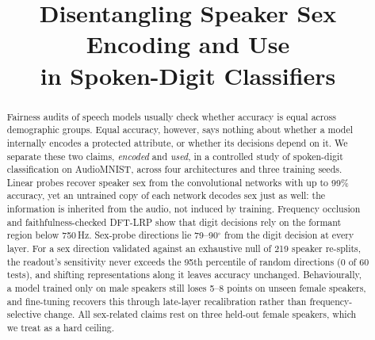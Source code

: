 \documentclass[conference]{IEEEtran}
\begin{document}
\title{Disentangling Speaker Sex Encoding and Use\\ in Spoken-Digit Classifiers}

\author{
\and
{}
}

\maketitle

\begin{abstract}
Fairness audits of speech models usually check whether accuracy is equal
across demographic groups. Equal accuracy, however, says nothing about
whether a model internally encodes a protected attribute, or whether its
decisions depend on it. We separate these two claims, \emph{encoded} and
\emph{used}, in a controlled study of spoken-digit classification on
AudioMNIST, across four architectures and three training seeds. Linear
probes recover speaker sex from the convolutional networks with up to 99\%
accuracy, yet an untrained copy of each network decodes sex just as well: the
information is inherited from the audio, not induced by training. Frequency occlusion and
faithfulness-checked DFT-LRP show that digit decisions rely on the formant
region below 750\,Hz. Sex-probe directions lie 79--90$^\circ$ from the
digit decision at every layer. For a sex direction validated against an
exhaustive null of 219 speaker re-splits, the readout's sensitivity never
exceeds the 95th percentile of random directions (0 of 60 tests), and
shifting representations along it leaves accuracy unchanged.
Behaviourally, a model trained only on male speakers still loses 5--8 points
on unseen female speakers, and fine-tuning recovers this through late-layer
recalibration rather than frequency-selective change. All sex-related claims
rest on three held-out female speakers, which we treat as a hard ceiling.
\end{abstract}
\end{document}

